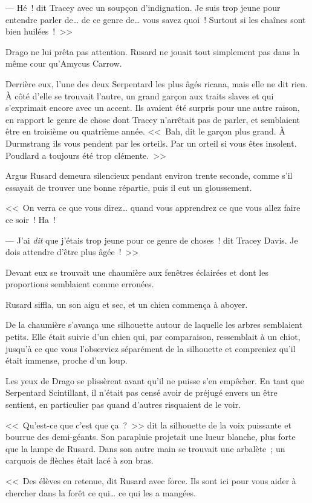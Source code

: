 --- Hé~! dit Tracey avec un soupçon d'indignation. Je suis trop jeune pour entendre parler de… de ce genre de… vous savez quoi~! Surtout si les chaînes sont bien huilées~!~>>

Drago ne lui prêta pas attention. Rusard ne jouait tout simplement pas dans la même cour qu'Amycus Carrow.

Derrière eux, l'une des deux Serpentard les plus âgés ricana, mais elle ne dit rien. À côté d'elle se trouvait l'autre, un grand garçon aux traits slaves et qui s'exprimait encore avec un accent. Ils avaient été surpris pour une autre raison, en rapport le genre de chose dont Tracey n'arrêtait pas de parler, et semblaient être en troisième ou quatrième année. <<~Bah, dit le garçon plus grand. À Durmstrang ils vous pendent par les orteils. Par un orteil si vous êtes insolent. Poudlard a toujours été trop clémente.~>>

Argus Rusard demeura silencieux pendant environ trente seconde, comme s'il essayait de trouver une bonne répartie, puis il eut un gloussement.

<<~On verra ce que vous direz… quand vous apprendrez ce que vous allez faire ce soir~! Ha~!

--- J'ai \emph{dit} que j'étais trop jeune pour ce genre de choses~! dit Tracey Davis. Je dois attendre d'être plus âgée~!~>>

Devant eux se trouvait une chaumière aux fenêtres éclairées et dont les proportions semblaient comme erronées.

Rusard siffla, un son aigu et sec, et un chien commença à aboyer.

De la chaumière s'avança une silhouette autour de laquelle les arbres semblaient petits. Elle était suivie d'un chien qui, par comparaison, ressemblait à un chiot, jusqu'à ce que vous l'observiez séparément de la silhouette et compreniez qu'il était immense, proche d'un loup.

Les yeux de Drago se plissèrent avant qu'il ne puisse s'en empêcher. En tant que Serpentard Scintillant, il n'était pas censé avoir de préjugé envers un être sentient, en particulier pas quand d'autres risquaient de le voir.

<<~Qu'est-ce que c'est que ça~?~>> dit la silhouette de la voix puissante et bourrue des demi-géants. Son parapluie projetait une lueur blanche, plus forte que la lampe de Rusard. Dans son autre main se trouvait une arbalète~; un carquois de flèches était lacé à son bras.

<<~Des élèves en retenue, dit Rusard avec force. Ils sont ici pour vous aider à chercher dans la forêt ce qui… ce qui les a mangées.

